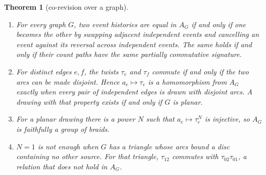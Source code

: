 \documentclass[11pt]{article}
\newtheorem{theorem}{Theorem}\newtheorem{proposition}[theorem]{Proposition}\newtheorem{lemma}[theorem]{Lemma}\newtheorem{corollary}[theorem]{Corollary}\newtheorem{conjecture}[theorem]{Conjecture}\crefname{conjecture}{Conjecture}{Conjectures}
\theoremstyle{definition}\newtheorem{definition}[theorem]{Definition}\newtheorem{remark}[theorem]{Remark}\newtheorem{example}[theorem]{Example}\newtheorem{problem}[theorem]{Open problem}\crefname{problem}{Problem}{Problems}
\begin{document}
\begin{theorem}[co-revision over a graph]\label{thm:graphs}
\begin{enumerate}
\item[(i)] For every graph $G$, two event histories are equal in $A_G$ if and only if one becomes the other by swapping adjacent independent events and cancelling an event against its reversal across independent events. The same holds if and only if their count paths have the same partially commutative signature.
\item[(ii)] For distinct edges $e,f$, the twists $\tau_e$ and $\tau_f$ commute if and only if the two arcs can be made disjoint. Hence $a_e\mapsto\tau_e$ is a homomorphism from $A_G$ exactly when every pair of independent edges is drawn with disjoint arcs. A drawing with that property exists if and only if $G$ is planar.
\item[(iii)] For a planar drawing there is a power $N$ such that $a_e\mapsto\tau_e^N$ is injective, so $A_G$ is faithfully a group of braids.
\item[(iv)] $N=1$ is not enough when $G$ has a triangle whose arcs bound a disc containing no other source. For that triangle, $\tau_{12}$ commutes with $\tau_{02}\tau_{01}$, a relation that does not hold in $A_G$.
\end{enumerate}
\end{theorem}
\end{document}
